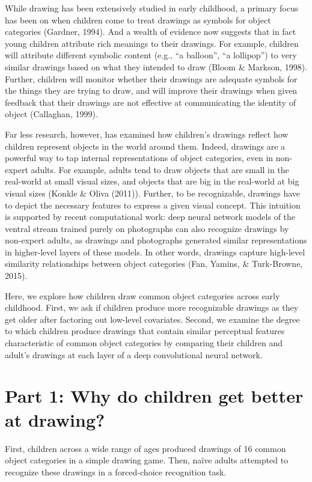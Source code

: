 \documentclass[10pt, letterpaper]{article}
\begin{document}
While drawing has been extensively studied in early childhood, a primary
focus has been on when children come to treat drawings as symbols for
object categories (Gardner, 1994). And a wealth of evidence now suggests
that in fact young children attribute rich meanings to their drawings.
For example, children will attribute different symbolic content (e.g.,
``a balloon'', ``a lollipop'') to very similar drawings based on what
they intended to draw (Bloom \& Markson, 1998). Further, children will
monitor whether their drawings are adequate symbols for the things they
are trying to draw, and will improve their drawings when given feedback
that their drawings are not effective at communicating the identity of
object (Callaghan, 1999).

Far less research, however, has examined how children's drawings reflect
how children represent objects in the world around them. Indeed,
drawings are a powerful way to tap internal representations of object
categories, even in non-expert adults. For example, adults tend to draw
objects that are small in the real-world at small visual sizes, and
objects that are big in the real-world at big visual sizes (Konkle \&
Oliva (2011)). Further, to be recognizable, drawings have to depict the
necessary features to express a given visual concept. This intuition is
supported by recent computational work: deep neural network models of
the ventral stream trained purely on photographs can also recognize
drawings by non-expert adults, as drawings and photographs generated
similar representations in higher-level layers of these models. In other
words, drawings capture high-level similarity relationships between
object categories (Fan, Yamins, \& Turk-Browne, 2015).

Here, we explore how children draw common object categories across early
childhood. First, we ask if children produce more recognizable drawings
as they get older after factoring out low-level covariates. Second, we
examine the degree to which children produce drawings that contain
similar perceptual features characteristic of common object categories
by comparing their children and adult's drawings at each layer of a deep
convolutional neural network.

\section{Part 1: Why do children get better at
drawing?}\label{part-1-why-do-children-get-better-at-drawing}

First, children across a wide range of ages produced drawings of 16
common object categories in a simple drawing game. Then, naïve adults
attempted to recognize these drawings in a forced-choice recognition
task.
\end{document}
